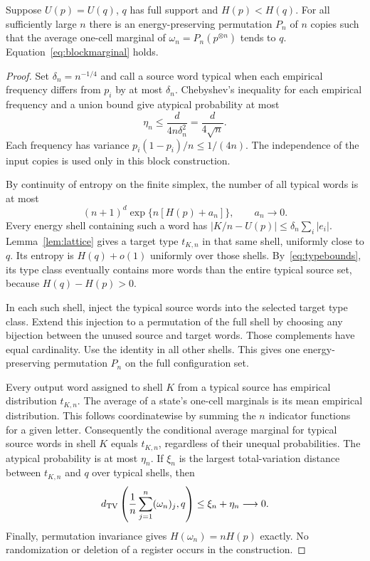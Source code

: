 \begin{lemma}\label{lem:block}
Suppose $U(p)=U(q)$, $q$ has full support and $H(p)<H(q)$. For all sufficiently large $n$ there is an energy-preserving permutation $P_n$ of $n$ copies such that the average one-cell marginal of $\omega_n=P_n(p^{\otimes n})$ tends to $q$. Equation~\eqref{eq:blockmarginal} holds.
\end{lemma}
\begin{proof}
Set $\delta_n=n^{-1/4}$ and call a source word typical when each empirical frequency differs from $p_i$ by at most $\delta_n$. Chebyshev's inequality for each empirical frequency and a union bound give atypical probability at most
\[
 \eta_n\le\frac{d}{4n\delta_n^2}=\frac{d}{4\sqrt n}.
\]
Each frequency has variance $p_i(1-p_i)/n\le1/(4n)$. The independence of the input copies is used only in this block construction.

By continuity of entropy on the finite simplex, the number of all typical words is at most
\[
 (n+1)^d\exp\{n[H(p)+a_n]\},\qquad a_n\longrightarrow0.
\]
Every energy shell containing such a word has $|K/n-U(p)|\le\delta_n\sum_i|e_i|$. Lemma~\ref{lem:lattice} gives a target type $t_{K,n}$ in that same shell, uniformly close to $q$. Its entropy is $H(q)+o(1)$ uniformly over those shells. By~\eqref{eq:typebounds}, its type class eventually contains more words than the entire typical source set, because $H(q)-H(p)>0$.

In each such shell, inject the typical source words into the selected target type class. Extend this injection to a permutation of the full shell by choosing any bijection between the unused source and target words. Those complements have equal cardinality. Use the identity in all other shells. This gives one energy-preserving permutation $P_n$ on the full configuration set.

Every output word assigned to shell $K$ from a typical source has empirical distribution $t_{K,n}$. The average of a state's one-cell marginals is its mean empirical distribution. This follows coordinatewise by summing the $n$ indicator functions for a given letter. Consequently the conditional average marginal for typical source words in shell $K$ equals $t_{K,n}$, regardless of their unequal probabilities. The atypical probability is at most $\eta_n$. If $\xi_n$ is the largest total-variation distance between $t_{K,n}$ and $q$ over typical shells, then
\[
 d_{\mathrm{TV}}\left(\frac1n\sum_{j=1}^n(\omega_n)_j,q\right)\le\xi_n+\eta_n\longrightarrow0.
\]
Finally, permutation invariance gives $H(\omega_n)=nH(p)$ exactly. No randomization or deletion of a register occurs in the construction.
\end{proof}


